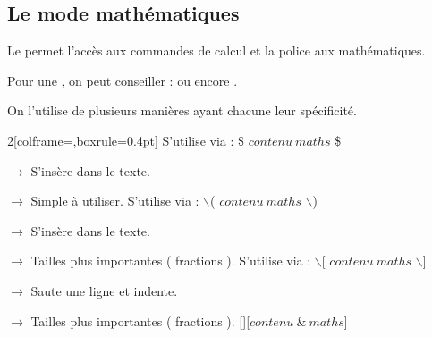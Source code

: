 \subsection{Le mode mathématiques}

\begin{Methode}
    Le  permet l'accès aux commandes de calcul et  la police aux mathématiques. 

    Pour une , on peut conseiller :  ou encore . 


    On l'utilise de plusieurs manières ayant chacune leur spécificité. 

    \begin{MultiColonnes}{2}[colframe=\itemBaseColor,boxrule=0.4pt]
        \tcbitem[title=Mode basique] S'utilise via : \$ $contenu\  maths$ \$

        $\rightarrow$ S'insère dans le texte.

        $\rightarrow$ Simple à utiliser. 
        \tcbitem[title=Mode étendu] S'utilise via : $\backslash$( $contenu\  maths$ $\backslash$)

        $\rightarrow$ S'insère dans le texte.

        $\rightarrow$ Tailles plus importantes ( fractions ). 
        \tcbitem[title=Mode display centré] S'utilise via : $\backslash$[ $contenu\  maths$ $\backslash$]

        $\rightarrow$ Saute une ligne et indente.

        $\rightarrow$ Tailles plus importantes ( fractions ). 
        \tcbitem[title=Mode equation / align]  [][$contenu\ \& \  maths$]
    \end{MultiColonnes}
\end{Methode}